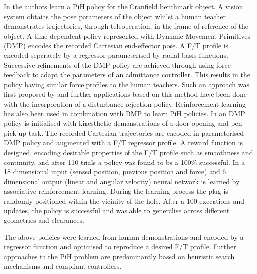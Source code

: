 In \cite{fast_peg_pbd_icmc_2014} the authors learn a PiH policy for the Cranfield benchmark object.
A vision system obtains the pose parameters of the object whilst a human teacher  
demonstrates trajectories, through teleoperation, in the frame of reference of the object. 
A time-dependent policy represented with Dynamic Movement Primitives (DMP) \cite{Schaal04learningmovement} 
encodes the recorded Cartesian end-effector pose. A F/T profile is encoded separately by a regressor parameterised 
by radial basis functions. Successive refinements of the DMP policy are achieved through 
using force feedback to adapt the parameters of an admittance controller. This results in the policy having
similar force profiles to the human teachers. Such an approach was first proposed by \cite{trans_workpiece_icra_2013}
and further applications based on this method have been done \cite{sol_pdg_pbd_2014} with the incorporation of  
a disturbance rejection policy.
Reinforcement learning has also been used in combination with DMP to learn PiH policies. In \cite{learn_force_c_icirs_2011}
an DMP policy is initialised with kinesthetic demonstrations of a door opening and pen pick up task. The recorded Cartesian 
trajectories are encoded in parameterised DMP policy and augmented with a F/T regressor profile. A reward function is designed, 
encoding desirable properties of the F/T profile such as smoothness and continuity, and after 110 trials a policy
was found to be a 100\% successful. In \cite{learn_admittance_icra_1994} a 18 dimensional input (sensed position, previous position and force)  and 6 dimensional 
output (linear and angular velocity) neural network is learned by associative reinforcement learning. 
During the learning process the plug is randomly positioned within the vicinity of the hole. After a 100 executions and 
updates, the policy is successful and was able to generalise across different geometries and clearances. 

The above policies were learned from human demonstrations and encoded by a regressor function and
optimised to reproduce a desired F/T profile. Further approaches to the PiH problem 
are predominantly based on heuristic search mechanisms and compliant controllers.

